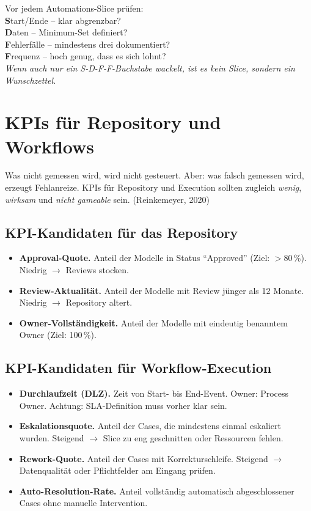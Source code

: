 \documentclass[11pt,a4paper,oneside]{article}
\newcommand{\caveatfontfallback}{\itshape}
\newcommand\caveatfont{\caveatfontfallback}%
\newcommand{\akzent}[1]{{\caveatfont\color{lpAmber}#1}}
\newcommand{\fachbegriff}[1]{\textbf{#1}}
\newcommand{\quelle}[1]{{\footnotesize\color{lpGray}(#1)}}
\begin{document}
\begin{eselsbox}[Eselsbrücke: \akzent{S-D-F-F}]
Vor jedem Automations-Slice prüfen:\\[2pt]
\textbf{S}tart/Ende -- klar abgrenzbar?\\
\textbf{D}aten -- Minimum-Set definiert?\\
\textbf{F}ehlerfälle -- mindestens drei dokumentiert?\\
\textbf{F}requenz -- hoch genug, dass es sich lohnt?\\[2pt]
\emph{Wenn auch nur ein S-D-F-F-Buchstabe wackelt, ist es kein Slice, sondern ein Wunschzettel.}
\end{eselsbox}

\section{KPIs für Repository und Workflows}

Was nicht gemessen wird, wird nicht gesteuert. Aber: was falsch gemessen wird, erzeugt Fehlanreize. KPIs für Repository und Execution sollten zugleich \emph{wenig}, \emph{wirksam} und \emph{nicht gameable} sein. \quelle{Reinkemeyer, 2020}

\subsection{KPI-Kandidaten für das Repository}

\begin{itemize}
  \item \fachbegriff{Approval-Quote.} Anteil der Modelle in Status ``Approved'' (Ziel: $>80\,\%$). Niedrig $\rightarrow$ Reviews stocken.
  \item \fachbegriff{Review-Aktualität.} Anteil der Modelle mit Review jünger als 12 Monate. Niedrig $\rightarrow$ Repository altert.
  \item \fachbegriff{Owner-Vollständigkeit.} Anteil der Modelle mit eindeutig benanntem Owner (Ziel: 100\,\%).
\end{itemize}

\subsection{KPI-Kandidaten für Workflow-Execution}

\begin{itemize}
  \item \fachbegriff{Durchlaufzeit (DLZ).} Zeit von Start- bis End-Event. Owner: Process Owner. Achtung: SLA-Definition muss vorher klar sein.
  \item \fachbegriff{Eskalationsquote.} Anteil der Cases, die mindestens einmal eskaliert wurden. Steigend $\rightarrow$ Slice zu eng geschnitten oder Ressourcen fehlen.
  \item \fachbegriff{Rework-Quote.} Anteil der Cases mit Korrekturschleife. Steigend $\rightarrow$ Datenqualität oder Pflichtfelder am Eingang prüfen.
  \item \fachbegriff{Auto-Resolution-Rate.} Anteil vollständig automatisch abgeschlossener Cases ohne manuelle Intervention.
\end{itemize}
\end{document}
